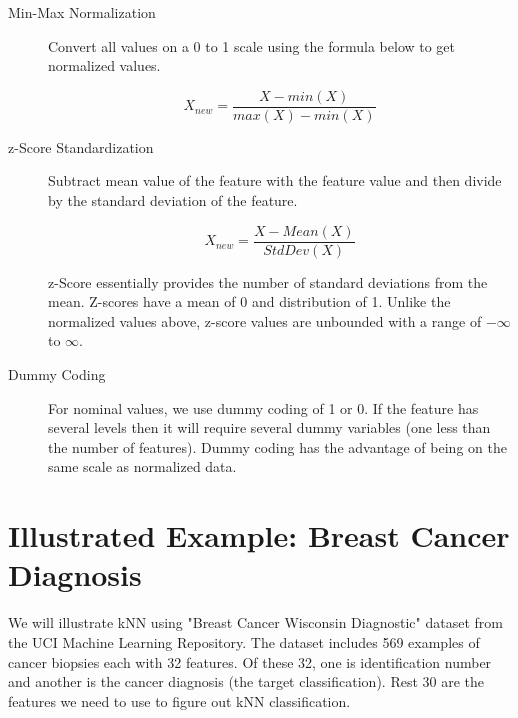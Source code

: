\documentclass[10pt, letterpaper, twoside]{memoir}\usepackage{knitr}
\begin{document}
\begin{description}

\item [Min-Max Normalization] Convert all values on a 0 to 1 scale using the formula below to get normalized values.

\[X_{new} = \frac{X - min(X)}{max(X) - min(X)}   \]

\item [z-Score Standardization] Subtract mean value of the feature with the feature value and then divide by the standard deviation of the feature.

\[X_{new} = \frac{X - Mean(X)}{StdDev(X)} \]

z-Score essentially provides the number of standard deviations from the mean. Z-scores have a mean of 0 and distribution of 1. Unlike the normalized values above, z-score values are unbounded with a range of $-\infty$ to $\infty$.

\item [Dummy Coding] For nominal values, we use dummy coding of 1 or 0. If the feature has several levels then it will require several dummy variables (one less than the number of features). Dummy coding has the advantage of being on the same scale as normalized data.
\end{description}

\section{Illustrated Example: Breast Cancer Diagnosis}

We will illustrate kNN using "Breast Cancer Wisconsin Diagnostic" dataset from the UCI Machine Learning Repository. The dataset includes 569 examples of cancer biopsies each with 32 features. Of these 32, one is identification number and another is the cancer diagnosis (the target classification). Rest 30 are the features we need to use to figure out kNN classification.

\begin{knitrout}
\color{fgcolor}\begin{kframe}
\begin{alltt}
 \hlkwb{<-} \hlstd{(}\hlstd{,}  \hlstd{=} \hlstd{)}
\end{alltt}
\end{kframe}
\end{knitrout}
\end{document}
